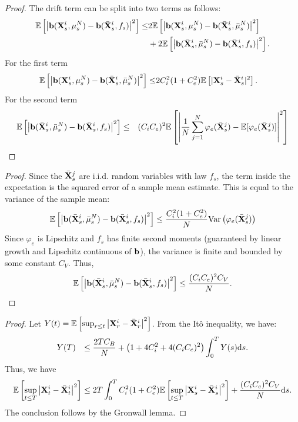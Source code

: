 \documentclass[aspectratio=169]{beamer}
\begin{document}
\begin{frame}
   \begin{proof}
The drift term can be split into two terms as follows:
\[
\begin{aligned}
     \mathbb E \left[ \left|\mathbf{b}(\mathbf{X}^i_s,\mu^N_s)-\mathbf{b}(\bar{\mathbf{X}}^i_s,f_s)  \right|^2\right]
 \leq &2\mathbb E \left[ \left|\mathbf{b}(\mathbf{X}^i_s,\mu^N_s)-\mathbf{b}(\bar{\mathbf{X}}^i_s,\bar{\mu}^N_s)  \right|^2\right]\\
 &+ 2\mathbb E \left[ \left|\mathbf{b}(\bar{\mathbf{X}}^i_s,\bar{\mu}^N_s)-\mathbf{b}(\bar{\mathbf{X}}^i_s,f_s)  \right|^2\right].
\end{aligned}
\]
For the first term 
\[
\begin{aligned}
   \mathbb E \left[ \left|\mathbf{b}(\mathbf{X}^i_s,\mu^N_s)-\mathbf{b}(\bar{\mathbf{X}}^i_s,\bar{\mu}^N_s)  \right|^2\right] 
   \leq & 2C_i^2(1+C_e^2)\mathbb E \left[|\mathbf{X}^i_s - \bar{\mathbf{X}}^i_s|^2 \right].
\end{aligned}
\]
For the second term 
$$\begin{aligned}
    & \mathbb E \left[ \left|\mathbf{b}(\bar{\mathbf{X}}^i_s,\bar{\mu}^N_s)-\mathbf{b}(\bar{\mathbf{X}}^i_s,f_s)  \right|^2\right]
    \leq & (C_i C_e)^2 \mathbb E \left[\left|  \frac{1}{N} \sum_{j=1}^N \varphi_e (\bar{\mathbf{X}}^j_s ) - \mathbb E[\varphi_e (\bar{\mathbf{X}}^j_s )] \right|^2  \right]
\end{aligned}$$
    \end{proof} 
\end{frame}
\begin{frame}
   \begin{proof}
Since the $\bar{\mathbf{X}}^j_s$ are i.i.d. random variables with law $f_s$, the term inside the expectation is the squared error of a sample mean estimate. This is equal to the variance of the sample mean:
$$ \mathbb E \left[ \left|\mathbf{b}(\bar{\mathbf{X}}^i_s,\bar{\mu}^N_s)-\mathbf{b}(\bar{\mathbf{X}}^i_s,f_s)  \right|^2\right] \leq\frac{C_i^2(1+C_e^2)}{N} \text{Var}\left( \varphi_e(\bar{\mathbf{X}}^j_s) \right)$$Since $\varphi_e$ 
is Lipschitz and $f_s$ has finite second moments (guaranteed by linear growth and Lipschitz continuous of $\mathbf{b}$), the variance is finite and bounded by some constant $C_V$. Thus,$$ \mathbb E \left[ \left|\mathbf{b}(\bar{\mathbf{X}}^i_s,\bar{\mu}^N_s)-\mathbf{b}(\bar{\mathbf{X}}^i_s,f_s)  \right|^2\right] \leq \frac{(C_i C_e)^2 C_V}{N} .$$
    \end{proof} 
\end{frame}
\begin{frame}
   \begin{proof}
Let $Y(t) = \mathbb E\left[\sup_{r\leq t}\left|\mathbf{X}^i_r-\bar{\mathbf{X}}^i_r\right|^2\right]$. From the Itô inequality, we have:
$$ \begin{aligned} Y(T) &
&\leq \frac{2 T C_B}{N} + \left(1 + 4 C_i^2 + 4 (C_i C_e)^2 \right) \int_0^T Y(s) \mathrm{d} s.
\end{aligned}$$
Thus, we have
\[
\begin{aligned}
    \mathbb E\left[\sup_{t\leq T}\left|\mathbf{X}^i_t-\bar{\mathbf{X}}^i_t\right|^2\right] \leq 2T\int_0^T C_i^2(1+C_e^2)  \mathbb E\left[\sup_{t\leq T}\left|\mathbf{X}^i_s-\bar{\mathbf{X}}^i_s\right|^2\right] + \frac{(C_i C_e)^2 C_V}{N}  
    \mathrm{d} s.
\end{aligned}
\]
The conclusion follows by the Gronwall lemma.
\end{proof} 
\end{frame}
\end{document}
